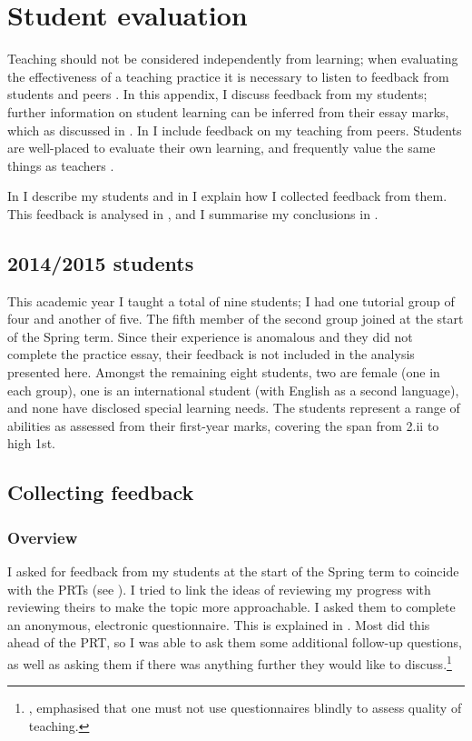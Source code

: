 \chapter{Student evaluation}\label{ap:student}

Teaching should not be considered independently from learning; when evaluating the effectiveness of a teaching practice it is necessary to listen to feedback from students and peers \citep[chapter 7]{Ramsden1992}. In this appendix, I discuss feedback from my students; further information on student learning can be inferred from their essay marks, which as discussed in . In  I include feedback on my teaching from peers. Students are well-placed to evaluate their own learning, and frequently value the same things as teachers \citep[chapter 6]{Ramsden1992}.

In  I describe my students and in  I explain how I collected feedback from them. This feedback is analysed in , and I summarise my conclusions in .

\section{2014/2015 students}\label{sec:2014-15students}

This academic year I taught a total of nine students; I had one tutorial group of four and another of five. The fifth member of the second group joined at the start of the Spring term. Since their experience is anomalous and they did not complete the practice essay, their feedback is not included in the analysis presented here. Amongst the remaining eight students, two are female (one in each group), one is an international student (with English as a second language), and none have disclosed special learning needs. The students represent a range of abilities as assessed from their first-year marks, covering the span from 2.ii to high 1st.

\section{Collecting feedback}\label{sec:questions}

\subsection{Overview}

I asked for feedback from my students at the start of the Spring term to coincide with the PRTs (see ). I tried to link the ideas of reviewing my progress with reviewing theirs to make the topic more approachable. I asked them to complete an anonymous, electronic questionnaire. This is explained in . Most did this ahead of the PRT, so I was able to ask them some additional follow-up questions, as well as asking them if there was anything further they would like to discuss.\footnote{\citet[chapter 11]{Ramsden1992}, emphasised that one must not use questionnaires blindly to assess quality of teaching.}

